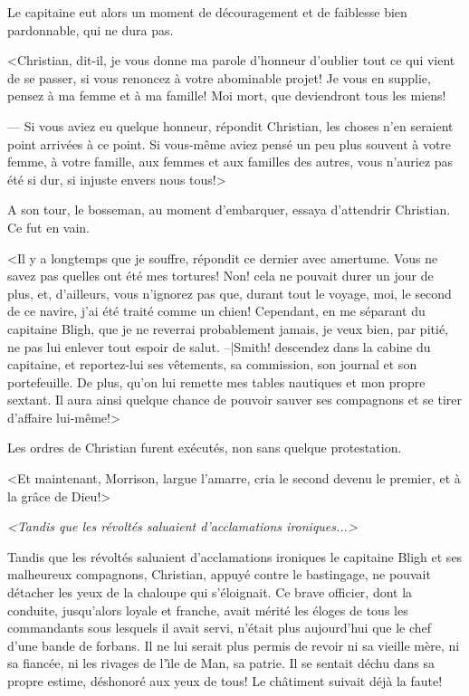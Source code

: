 Le capitaine eut alors un moment de d\'ecouragement
et de faiblesse bien pardonnable, qui ne dura pas.

<Christian, dit-il, je vous donne ma parole d'honneur
d'oublier tout ce qui vient de se passer, si vous renoncez
\`a votre abominable projet! Je vous en supplie, pensez
\`a ma femme et \`a ma famille!
Moi mort, que deviendront tous les miens!

--- Si vous aviez eu quelque honneur, r\'epondit Christian,
les choses n'en seraient point arriv\'ees \`a ce point.
Si vous-m\^eme aviez pens\'e un peu plus souvent \`a votre femme,
\`a votre famille, aux femmes et aux familles des autres, vous
n'auriez pas \'et\'e si dur, si injuste envers nous tous!>

A son tour, le bosseman, au moment d'embarquer,
essaya d'at\-ten\-drir Christian.
Ce fut en vain.

<Il y a longtemps que je souffre, r\'epondit ce dernier
avec amertume. Vous ne savez pas quelles ont \'et\'e mes
tortures! Non! cela ne pouvait durer un jour de plus, et,
d'ailleurs, vous n'ignorez pas que, durant tout le voyage,
moi, le second de ce navire, j'ai \'et\'e trait\'e comme
un chien! Cependant, en me s\'eparant du capitaine Bligh,
que je ne reverrai probablement jamais, je veux bien, par
piti\'e, ne pas lui enlever tout espoir de salut.
--|Smith! descendez dans la cabine du capitaine, et reportez-lui
ses v\^etements, sa commission, son journal et son portefeuille.
De plus, qu'on lui remette mes tables nautiques et mon propre
sextant. Il aura ainsi quelque chance de pouvoir sauver ses
compagnons et se tirer d'affaire lui-m\^eme!>

Les ordres de Christian furent ex\'ecut\'es,
non sans quelque protestation.

<Et maintenant, Morrison, largue l'amarre, cria
le second devenu le premier, et \`a la gr\^ace de Dieu!>

\pageinsert
\vskip 15cm
\centerline{}
\smallskip
\centerline{\it <Tandis que les r\'evolt\'es
  saluaient d'acclamations ironiques...>}
\vfill
\endinsert

Tandis que les r\'evolt\'es saluaient d'acclamations
ironiques le capitaine Bligh et ses malheureux compagnons,
Christian, appuy\'e contre le bastingage, ne pouvait
d\'etacher les yeux de la chaloupe qui s'\'eloignait.
Ce brave officier, dont la conduite, jusqu'alors loyale
et franche, avait m\'erit\'e les \'eloges de tous les
commandants sous lesquels il avait servi, n'\'etait
plus aujourd'hui que le chef d'une bande de forbans.
Il ne lui serait plus permis de revoir ni sa vieille
m\`ere, ni sa fianc\'ee, ni les rivages de l'{\^\i}le
de Man, sa patrie. Il se sentait d\'echu dans sa propre
estime, d\'eshonor\'e aux yeux de tous!
Le ch\^atiment suivait d\'ej\`a la faute!

